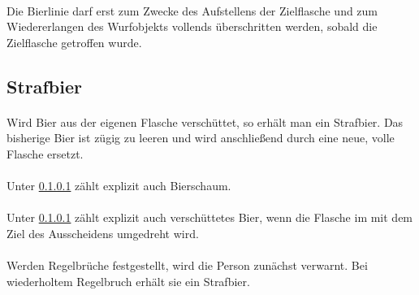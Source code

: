\paragraph{}
Die Bierlinie darf erst zum Zwecke des Aufstellens der Zielflasche und zum Wiedererlangen des Wurfobjekts vollends überschritten werden, sobald die Zielflasche getroffen wurde.


\subsection{Strafbier}
\paragraph{} \label{Flunkyball:Strafbier:Allg}
Wird Bier aus der eigenen Flasche verschüttet, so erhält man ein Strafbier.
Das bisherige Bier ist zügig zu leeren und wird anschließend durch eine neue, volle Flasche ersetzt.

\paragraph{}
Unter \ref{Flunkyball:Strafbier:Allg} zählt explizit auch Bierschaum.

\paragraph{}
Unter \ref{Flunkyball:Strafbier:Allg} zählt explizit auch verschüttetes Bier, wenn die Flasche im mit dem Ziel des Ausscheidens umgedreht wird.

\paragraph{}
Werden Regelbrüche festgestellt, wird die Person zunächst verwarnt.
Bei wiederholtem Regelbruch erhält sie ein Strafbier.